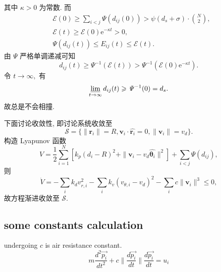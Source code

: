 \documentclass{article}
\theoremstyle{definition} %
\begin{document}
其中 $\kappa>0$ 为常数. 而
\begin{align*}
     & \mathcal{E}(0)\geqslant\sum_{i<j}\mathit{\Psi}(d_{ij}(0))>\psi(d_s+\sigma)\cdot\binom{N}{2}, \\
     & \mathcal{E}(t)\geqslant\mathcal{E}(0)\mathrm{e}^{-\kappa t}>0,                               \\
     & \mathit{\Psi}(d_{ij}(t))\leqslant E_{ij}(t)\leqslant\mathcal{E}(t).
\end{align*}
由 $\mathit{\Psi}$ 严格单调递减可知
\begin{equation*}
    d_{ij}(t)\geqslant\mathit{\Psi}^{-1}(\mathcal{E}(t))>\mathit{\Psi}^{-1}(\mathcal{E}(0)\mathrm{e}^{-\kappa t}).
\end{equation*}
令 $t\to\infty,$ 有
\begin{equation*}
    \varliminf_{t\to\infty}d_{ij}(t)\geqslant\mathit{\Psi}^{-1}(0)=d_s.
\end{equation*}
故总是不会相撞.\par
下面讨论收敛性, 即讨论系统收敛至
\begin{equation*}
    \mathcal{S}=\{\|\boldsymbol{r}_i\|=R,\boldsymbol{v}_i\cdot\widehat{\boldsymbol{r}_i}=0,\|\boldsymbol{v}_i\|=v_d\}.
\end{equation*}
构造 Lyapunov 函数
\begin{equation*}
    V=\frac{1}{2}\sum_{i=1}^N[k_p(d_i-R)^2+\|\boldsymbol{v}_i-v_d\widehat{\boldsymbol{\theta}_i}\|^2]+\sum_{i<j}\mathit{\Psi}(d_{ij}),
\end{equation*}
则
\begin{equation*}
    \dot{V}=-\sum_{i}k_dv_{r,i}^2-\sum_ik_v(v_{\theta,i}-v_d)^2-\sum_ic\|\boldsymbol{v}_i\|^3\leqslant0,
\end{equation*}
故方程渐进收敛至 $\mathcal{S}$.

\subsection{some constants calculation}
undergoing
\(c\) is air resistance constant.
\[
    m\frac{d^2 \vec{p_i}}{dt^2}+c\|\frac{d\vec{p_i}}{dt}\|\frac{d\vec{p_i}}{dt}=u_i
\]



\end{document}
